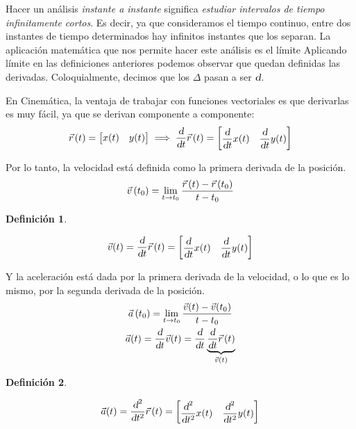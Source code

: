 \documentclass[a5paper,12pt,twoside]{book}
\newtheorem{defn}{{Definición}}[chapter]
\begin{document}
Hacer un análisis \emph{instante a instante} significa \emph{estudiar intervalos de tiempo infinitamente cortos}.
Es decir, ya que consideramos el tiempo continuo, entre dos instantes de tiempo determinados hay infinitos instantes que los separan.
La aplicación matemática que nos permite hacer este análisis es el límite
Aplicando límite en las definiciones anteriores podemos observar que quedan definidas las derivadas.
Coloquialmente, decimos que los $\Delta$ pasan a ser $\textsl{d}$.

En Cinemática, la ventaja de trabajar con funciones vectoriales es que derivarlas es muy fácil, ya que se derivan componente a componente:
\[
  \vec{r}\hspace{0.05cm} (t) = \begin{bmatrix} x(t) & y(t) \end{bmatrix} \implies
  \dfrac{\textsl{d}}{\textsl{d} t} \vec{r}\hspace{0.05cm} (t) =
  \begin{bmatrix} \dfrac{\textsl{d}}{\textsl{d} t} x(t) & \dfrac{\textsl{d}}{\textsl{d} t} y(t) \end{bmatrix}
\]

Por lo tanto, la velocidad está definida como la primera derivada de la posición.
\begin{equation*}
    \Vec{v}\left(t_0\right) = \lim_{t \to t_0} \dfrac{\vec{r}\hspace{0.05cm}(t)-\vec{r}\hspace{0.05cm}(t_0)}{t-t_0}
\end{equation*}

\begin{mdframed}[style=MyFrame1]
    \begin{defn}
    \end{defn}
    \begin{equation*}
        \Vec{v}(t) = \dfrac{\textsl{d}}{\textsl{d} t} \vec{r}\hspace{0.05cm} (t) = { \begin{bmatrix} \dfrac{\textsl{d}}{\textsl{d} t} x(t) & \dfrac{\textsl{d}}{\textsl{d} t} y(t) \end{bmatrix} }
    \end{equation*}
\end{mdframed}

Y la aceleración está dada por la primera derivada de la velocidad, o lo que es lo mismo, por la segunda derivada de la posición.
\begin{gather*}
    \Vec{a}\left(t_0\right) = \lim_{t \to t_0} \dfrac{\Vec{v}(t)-\Vec{v}(t_0)}{t-t_0}
    \\
    \Vec{a}(t) =
    \dfrac{\textsl{d}}{\textsl{d} t} \Vec{v} (t) =
    \dfrac{\textsl{d}}{\textsl{d} t} \underbrace{\dfrac{\textsl{d}}{\textsl{d} t} \vec{r}\hspace{0.05cm} (t)}_{\Vec{v}(t)}
\end{gather*}

\begin{mdframed}[style=MyFrame1]
    \begin{defn}
    \end{defn}
    \begin{equation*}
        \Vec{a}(t) =
        \dfrac{\textsl{d}^2}{\textsl{d} t^2} \vec{r}\hspace{0.05cm} (t) =
        \begin{bmatrix}
            \dfrac{\textsl{d}^2}{\textsl{d} t^2} x(t) & \dfrac{\textsl{d}^2}{\textsl{d} t^2} y(t)
        \end{bmatrix}
    \end{equation*}
\end{mdframed}
\end{document}
